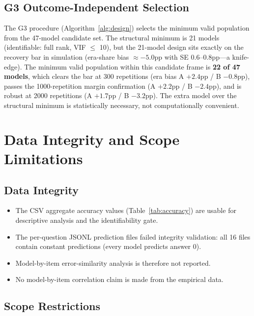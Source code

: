 \documentclass[journal]{IEEEtran}
\begin{document}
\subsection{G3 Outcome-Independent Selection}

The G3 procedure (Algorithm~\ref{alg:design}) selects the minimum valid population from the 47-model candidate set. The structural minimum is 21 models (identifiable: full rank, VIF $\leq$ 10), but the 21-model design sits exactly on the recovery bar in simulation (era-share bias $\approx -5.0$pp with SE $0.6$--$0.8$pp---a knife-edge). The minimum valid population within this candidate frame is \textbf{22 of 47 models}, which clears the bar at 300 repetitions (era bias A $+2.4$pp / B $-0.8$pp), passes the 1000-repetition margin confirmation (A $+2.2$pp / B $-2.4$pp), and is robust at 2000 repetitions (A $+1.7$pp / B $-3.2$pp). The extra model over the structural minimum is statistically necessary, not computationally convenient.

\section{Data Integrity and Scope Limitations}
\label{sec:data_integrity}

\subsection{Data Integrity}

\begin{itemize}
\item The CSV aggregate accuracy values (Table~\ref{tab:accuracy}) are usable for descriptive analysis and the identifiability gate.
\item The per-question JSONL prediction files failed integrity validation: all 16 files contain constant predictions (every model predicts answer 0).
\item Model-by-item error-similarity analysis is therefore not reported.
\item No model-by-item correlation claim is made from the empirical data.
\end{itemize}

\subsection{Scope Restrictions}
\end{document}
